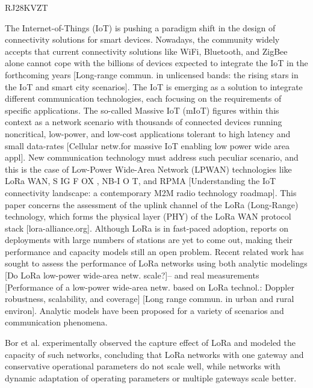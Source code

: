 \cite{hoeller_exploiting_2018} RJ28KVZT

The Internet-of-Things (IoT) is pushing a paradigm shift in the design of connectivity solutions for smart devices.
Nowadays,
	the community widely accepts that current connectivity solutions like WiFi,
	Bluetooth,
	and ZigBee alone cannot cope with the billions of devices expected to integrate the IoT in the forthcoming years [Long-range commun.
in unlicensed bands:
	the rising stars in the IoT and smart city scenarios].
The IoT is emerging as a solution to integrate different communication technologies,
	each focusing on the requirements of specific applications.
The so-called Massive IoT (mIoT) figures within this context as a network scenario with thousands of connected devices running noncritical,
	low-power,
	and low-cost applications tolerant to high latency and small data-rates [Cellular netw.for massive IoT enabling low power wide area appl].
New communication technology must address such peculiar scenario,
	and this is the case of Low-Power Wide-Area Network (LPWAN) technologies like LoRa WAN,
	S IG F OX ,
	NB-I O T,
	and RPMA [Understanding the IoT connectivity landscape:
	a contemporary M2M radio technology roadmap].
This paper concerns the assessment of the uplink channel of the LoRa (Long-Range) technology,
	which forms the physical layer (PHY) of the LoRa WAN protocol stack [lora-alliance.org].
Although LoRa is in fast-paced adoption,
	reports on deployments with large numbers of stations are yet to come out,
	making their performance and capacity models still an open problem.
Recent related work has sought to assess the performance of LoRa networks using both analytic modelings [Do LoRa low-power wide-area netw.
scale?]–\cite{georgiou_low_2017}\cite{pop_does_2017} and real measurements  [Performance of a low-power wide-area netw.
based on LoRa technol.:
	Doppler robustness,
	scalability,
	and coverage] \cite{wang_performance_2017}
\cite{neumann_indoor_2016}
\cite{angrisani_lora_2017}
\cite{jorke_urban_2017}
[Long range commun.
in urban and rural environ].
Analytic models have been proposed for a variety of scenarios and communication phenomena.

Bor et al.
\cite{bor_lora_2016} experimentally observed the capture effect of LoRa and modeled the capacity of such networks,
	concluding that LoRa networks with one gateway and conservative operational parameters do not scale well,
	while networks with dynamic adaptation of operating parameters or multiple gateways scale better.


